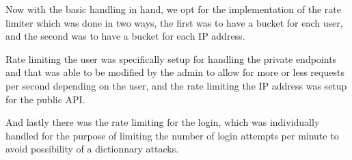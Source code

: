 Now with the basic handling in hand, we opt for the implementation of the rate limiter
which was done in two ways, the first was to have a bucket for each user,
and the second was to have a bucket for each IP address.

Rate limiting the user was specifically setup for handling the private endpoints and that
was able to be modified by the admin to allow for more or less requests per second
depending on the user, and the rate limiting the IP address was setup for the public API.

And lastly there was the rate limiting for the login, which was individually handled for
the purpose of limiting the number of login attempts per minute to avoid possibility
of a dictionnary attacks.

